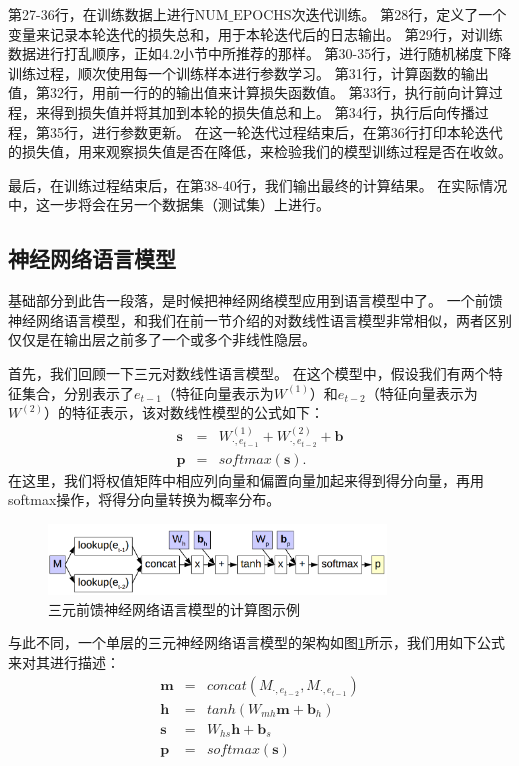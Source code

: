 \documentclass[10pt,a4paper]{ctexart}
\begin{document}
第27-36行，在训练数据上进行$\mathrm{NUM\_EPOCHS}$次迭代训练。
第28行，定义了一个变量来记录本轮迭代的损失总和，用于本轮迭代后的日志输出。
第29行，对训练数据进行打乱顺序，正如4.2小节中所推荐的那样。
第30-35行，进行随机梯度下降训练过程，顺次使用每一个训练样本进行参数学习。
第31行，计算函数的输出值，第32行，用前一行的的输出值来计算损失函数值。
第33行，执行前向计算过程，来得到损失值并将其加到本轮的损失值总和上。
第34行，执行后向传播过程，第35行，进行参数更新。
在这一轮迭代过程结束后，在第36行打印本轮迭代的损失值，用来观察损失值是否在降低，来检验我们的模型训练过程是否在收敛。

最后，在训练过程结束后，在第38-40行，我们输出最终的计算结果。
在实际情况中，这一步将会在另一个数据集（测试集）上进行。

\subsection{神经网络语言模型}
基础部分到此告一段落，是时候把神经网络模型应用到语言模型\cite{nakamura1990neural,bengio2003neural}中了。
一个前馈神经网络语言模型，和我们在前一节介绍的对数线性语言模型非常相似，两者区别仅仅是在输出层之前多了一个或多个非线性隐层。

首先，我们回顾一下三元对数线性语言模型。
在这个模型中，假设我们有两个特征集合，分别表示了$e_{t-1}$（特征向量表示为$W^{(1)}$）和$e_{t-2}$（特征向量表示为$W^{(2)}$）的特征表示，该对数线性模型的公式如下：
\begin{eqnarray}
 \textbf{s} & = & W_{\cdot,e_{t-1}}^{(1)} + W_{\cdot,e_{t-2}}^{(2)} + \textbf{b} \nonumber \\
 \textbf{p} & = & softmax( \textbf{s} ). \label{eq:41}
\end{eqnarray}
在这里，我们将权值矩阵中相应列向量和偏置向量加起来得到得分向量，再用softmax操作，将得分向量转换为概率分布。

\begin{figure}[H]
\centering
\includegraphics[width=0.8\textwidth]{fig12.png}
\caption{三元前馈神经网络语言模型的计算图示例}
\label{fig:12}
\end{figure}

与此不同，一个单层的三元神经网络语言模型的架构如图\ref{fig:12}所示，我们用如下公式来对其进行描述：
\begin{eqnarray}
 \textbf{m} & = & concat(M_{\cdot,e_{t-2}},M_{\cdot,e_{t-1}}) \nonumber \\
 \textbf{h} & = & tanh( W_{mh}\textbf{m} + \textbf{b}_h) \nonumber \\
 \textbf{s} & = & W_{hs}\textbf{h} + \textbf{b}_s \nonumber \\
 \textbf{p} & = & softmax(\textbf{s}) \label{eq:42}
\end{eqnarray}
\end{document}
